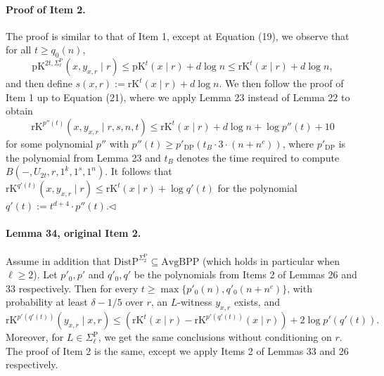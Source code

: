 \paragraph{Proof of Item 2.} The proof is similar to that of Item 1, except at Equation (19), we observe that for all $t\geq q_0(n)$,
\[\mathrm{pK}^{2t,\Sigma_\ell^{\mathrm P}}(x,y_{x,r}\mid r)\leq\mathrm{pK}^t(x\mid r)+d\log n\leq\mathrm{rK}^t(x\mid r)+d\log n,\]
and then define $s(x,r):=\mathrm{rK}^t(x\mid r)+d\log n$. We then follow the proof of Item 1 up to Equation (21), where we apply Lemma 23 instead of Lemma 22 to obtain
\[\mathrm{rK}^{p''(t)}(x,y_{x,r}\mid r,s,n,t)\leq\mathrm{rK}^t(x\mid r)+d\log n+\log p''(t)+10\]
for some polynomial $p''$ with $p''(t)\geq p'_{\mathrm{DP}}(t_B\cdot3\cdot(n+n^c))$, where $p'_{\mathrm{DP}}$ is the polynomial from Lemma 23 and $t_B$ denotes the time required to compute $B(-,U_{2t},r,1^k,1^s,1^n)$. It follows that $\mathrm{rK}^{q'(t)}(x,y_{x,r}\mid r)\leq\mathrm{rK}^t(x\mid r)+\log q'(t)$ for the polynomial $q'(t):=t^{d+4}\cdot p''(t)$.\hfill$\triangleleft$
\paragraph{Lemma 34, original Item 2.} Assume in addition that $\mathrm{DistP}^{\Sigma_2^{\mathrm P}}\subseteq\mathrm{AvgBPP}$ (which holds in particular when $\ell\geq2$). Let $p'_0,p'$ and $q'_0,q'$ be the polynomials from Items 2 of Lemmas 26 and 33 respectively. Then for every $t\geq\max\{p'_0(n),q'_0(n+n^c)\}$, with probability at least $\delta-1/5$ over $r$, an $L$-witness $y_{x,r}$ exists, and
\[\mathrm{rK}^{p'(q'(t))}(y_{x,r}\mid x,r)\leq(\mathrm{rK}^t(x\mid r)-\mathrm{rK}^{p'(q'(t))}(x\mid r))+2\log p'(q'(t)).\]
Moreover, for $L\in\Sigma_\ell^{\mathrm P}$, we get the same conclusions without conditioning on $r$.
The proof of Item 2 is the same, except we apply Items 2 of Lemmas 33 and 26 respectively.
